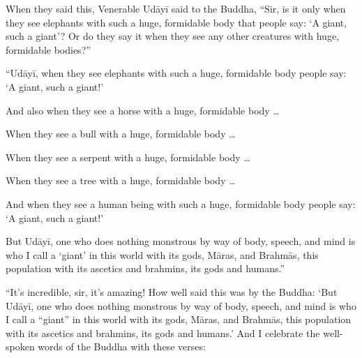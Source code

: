 \documentclass[12pt,openany]{book}%
\begin{document}
When they said this, Venerable \textsanskrit{Udāyī} said to the Buddha, “Sir, is it only when they see elephants with such a huge, formidable body that people say: ‘A giant, such a giant’? Or do they say it when they see any other creatures with huge, formidable bodies?” 

“\textsanskrit{Udāyī}, when they see elephants with such a huge, formidable body people say: ‘A giant, such a giant!’ 

And also when they see a horse with a huge, formidable body … 

When they see a bull with a huge, formidable body … 

When they see a serpent with a huge, formidable body … 

When they see a tree with a huge, formidable body … 

And when they see a human being with such a huge, formidable body people say: ‘A giant, such a giant!’ 

But \textsanskrit{Udāyī}, one who does nothing monstrous by way of body, speech, and mind is who I call a ‘giant’ in this world with its gods, \textsanskrit{Māras}, and \textsanskrit{Brahmās}, this population with its ascetics and brahmins, its gods and humans.” 

“It’s incredible, sir, it’s amazing! How well said this was by the Buddha: ‘But \textsanskrit{Udāyī}, one who does nothing monstrous by way of body, speech, and mind is who I call a “giant” in this world with its gods, \textsanskrit{Māras}, and \textsanskrit{Brahmās}, this population with its ascetics and brahmins, its gods and humans.’ And I celebrate the well-spoken words of the Buddha with these verses: 
\end{document}

